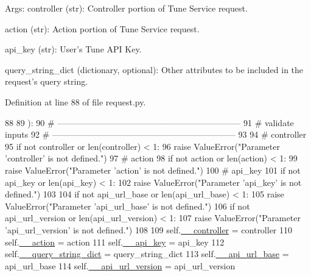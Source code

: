 Args\-: controller (str)\-: Controller portion of Tune Service request.\par
 action (str)\-: Action portion of Tune Service request.\par
 api\-\_\-key (str)\-: User's Tune A\-P\-I Key.\par
 query\-\_\-string\-\_\-dict (dictionary, optional)\-: Other attributes to be included in the request's query string.\par


Definition at line 88 of file request.\-py.


\begin{DoxyCode}
88 
89         ):
90         \textcolor{comment}{# -----------------------------------------------------------------}
91         \textcolor{comment}{# validate inputs}
92         \textcolor{comment}{# -----------------------------------------------------------------}
93 
94         \textcolor{comment}{# controller}
95         \textcolor{keywordflow}{if} \textcolor{keywordflow}{not} controller \textcolor{keywordflow}{or} len(controller) < 1:
96             \textcolor{keywordflow}{raise} ValueError(\textcolor{stringliteral}{"Parameter 'controller' is not defined."})
97         \textcolor{comment}{# action}
98         \textcolor{keywordflow}{if} \textcolor{keywordflow}{not} action \textcolor{keywordflow}{or} len(action) < 1:
99             \textcolor{keywordflow}{raise} ValueError(\textcolor{stringliteral}{"Parameter 'action' is not defined."})
100         \textcolor{comment}{# api\_key}
101         \textcolor{keywordflow}{if} \textcolor{keywordflow}{not} api\_key \textcolor{keywordflow}{or} len(api\_key) < 1:
102             \textcolor{keywordflow}{raise} ValueError(\textcolor{stringliteral}{"Parameter 'api\_key' is not defined."})
103 
104         \textcolor{keywordflow}{if} \textcolor{keywordflow}{not} api\_url\_base \textcolor{keywordflow}{or} len(api\_url\_base) < 1:
105             \textcolor{keywordflow}{raise} ValueError(\textcolor{stringliteral}{"Parameter 'api\_url\_base' is not defined."})
106         \textcolor{keywordflow}{if} \textcolor{keywordflow}{not} api\_url\_version \textcolor{keywordflow}{or} len(api\_url\_version) < 1:
107             \textcolor{keywordflow}{raise} ValueError(\textcolor{stringliteral}{"Parameter 'api\_url\_version' is not defined."})
108 
109         self.\hyperlink{classtune_1_1management_1_1service_1_1request_1_1Request_a16ea1de1e3528c170d6d6d4e886d8a57}{\_\_controller} = controller
110         self.\hyperlink{classtune_1_1management_1_1service_1_1request_1_1Request_a4cfd4168ab674ad3c00f1c51042fdb52}{\_\_action} = action
111         self.\hyperlink{classtune_1_1management_1_1service_1_1request_1_1Request_a22c60e8b0bc6ebf34ef274bad727c326}{\_\_api\_key} = api\_key
112         self.\hyperlink{classtune_1_1management_1_1service_1_1request_1_1Request_aa260968d316e04dd072fb75d678cd09f}{\_\_query\_string\_dict} = query\_string\_dict
113         self.\hyperlink{classtune_1_1management_1_1service_1_1request_1_1Request_a96e16362ed19c5a920c8db329ed1efc2}{\_\_api\_url\_base} = api\_url\_base
114         self.\hyperlink{classtune_1_1management_1_1service_1_1request_1_1Request_a32a69015326a6969e0da384e9a444641}{\_\_api\_url\_version} = api\_url\_version


\end{DoxyCode}
